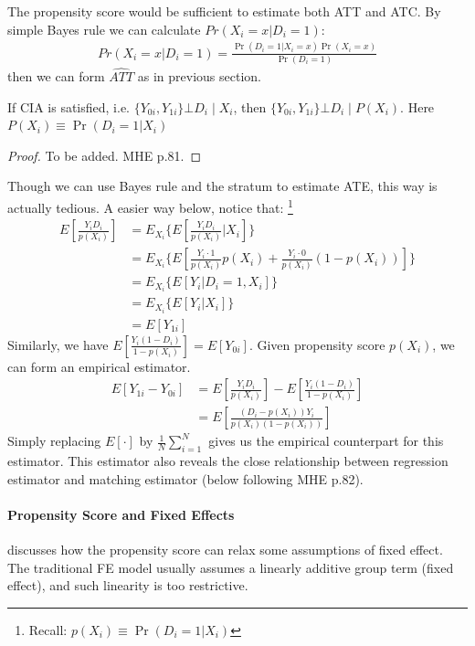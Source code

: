 The propensity score would be sufficient to estimate both ATT and ATC. 
By simple Bayes rule we can calculate $Pr(X_i = x | D_i=1)$:
\begin{align*}
    Pr(X_i = x | D_i=1) = \frac{\Pr(D_i=1|X_i=x)\Pr(X_i=x)}{\Pr(D_i=1)}
\end{align*}
then we can form $\widehat{ATT}$ as in previous section.

\begin{thm}
    If CIA is satisfied, i.e. $\{Y_{0i},Y_{1i}\} \bot D_i \mid X_i $, then $\{Y_{0i},Y_{1i}\} \bot D_i \mid P(X_i) $. Here $P(X_i) \equiv \Pr(D_i=1|X_i)$
\end{thm}

\begin{proof}
    To be added. MHE p.81.
\end{proof}

Though we can use Bayes rule and the stratum to estimate ATE, this way is actually tedious. A easier way below, notice that:
\footnote{Recall: $p(X_i)\equiv \Pr(D_i=1|X_i)$}
\begin{align*}
    E[\frac{Y_i D_i}{p(X_i)}] &= E_{X_i}\{E[\frac{Y_i D_i}{p(X_i)} | X_i]\} \\
    &= E_{X_i} \{E[\frac{Y_i\cdot 1}{p(X_i)}p(X_i) + \frac{Y_i\cdot 0}{p(X_i)}(1-p(X_i))]\} \\
    &= E_{X_i}\{E[Y_i | D_i=1,X_i]\} \\
    &= E_{X_i}\{E[Y_i | X_i]\} \\
    &= E[Y_{1i}]
\end{align*}
Similarly, we have $E[\frac{Y_i(1-D_i)}{1-p(X_i)}] = E[Y_{0i}]$. 
Given propensity score $p(X_i)$, we can form an empirical estimator.
\begin{align*}
    E[Y_{1i}-Y_{0i}] &= E[\frac{Y_i D_i}{p(X_i)}] - E[\frac{Y_i(1-D_i)}{1-p(X_i)}]\\
    &= E[
    \frac{(D_i- p(X_i))Y_i}{p(X_i)(1-p(X_i))}
    ]
\end{align*}
Simply replacing $E[\cdot]$ by $\frac{1}{N} \sum_{i=1}^N$ gives us the empirical counterpart for this estimator.
This estimator also reveals the close relationship between regression estimator and matching estimator (below following MHE p.82).

\paragraph{Propensity Score and Fixed Effects}

\citet{ArkhangelskyImbens2019} discusses how the propensity score can relax some assumptions of fixed effect.
The traditional FE model usually assumes a linearly additive group term (fixed effect), and such linearity is too restrictive.

